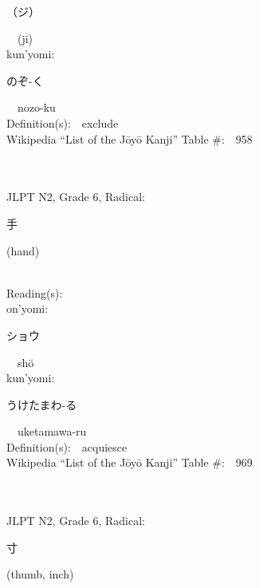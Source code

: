 \begin{multicols}{2}
{\hspace*{2em}}{\begin{CJK}{UTF8}{min} （ジ） \end{CJK}}\ \ (ji)\ \ \\
{\hspace*{1em}}kun'yomi:\ \ \\
{\hspace*{2em}}{\begin{CJK}{UTF8}{min} のぞ-く \end{CJK}}\ \ nozo-ku\ \ \\
Definition(s):\ \ exclude \\
Wikipedia ``List of the J\=oy\=o Kanji'' Table \#:\ \ 958 \\
\ \ \\
{\fontsize{34pt}{40pt}  }\ \ \\  %
{JLPT N2, Grade 6, Radical:\ \ {\begin{CJK}{UTF8}{min} 手 \end{CJK}} (hand) } \\
Reading(s):\ \ \\
{\hspace*{1em}}on'yomi:\ \ \\
{\hspace*{2em}}{\begin{CJK}{UTF8}{min} ショウ \end{CJK}}\ \ sh\=o\ \ \\
{\hspace*{1em}}kun'yomi:\ \ \\
{\hspace*{2em}}{\begin{CJK}{UTF8}{min} うけたまわ-る \end{CJK}}\ \ uketamawa-ru\ \ \\
Definition(s):\ \ acquiesce \\
Wikipedia ``List of the J\=oy\=o Kanji'' Table \#:\ \ 969 \\
\ \ \\
{\fontsize{34pt}{40pt}  }\ \ \\  %
{JLPT N2, Grade 6, Radical:\ \ {\begin{CJK}{UTF8}{min} 寸 \end{CJK}} (thumb, inch) } \\

\end{multicols}
